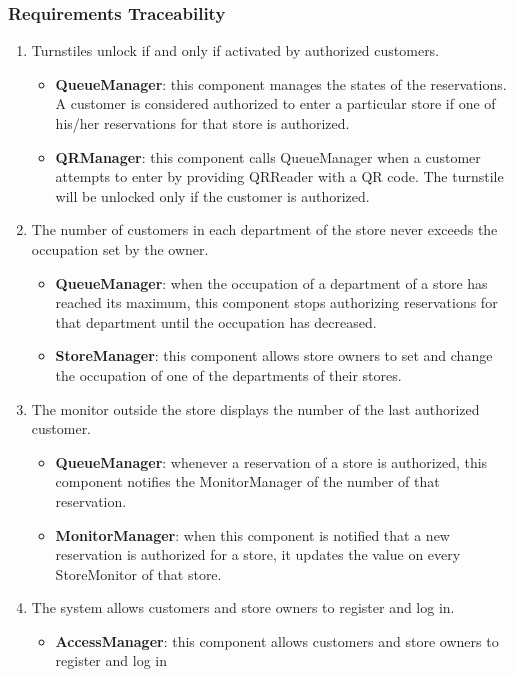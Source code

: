 \subsubsection{Requirements Traceability}
\begin{enumerate}[label=R\arabic*]
	\item Turnstiles unlock if and only if activated by authorized customers.
	\begin{itemize}
		\item \textbf{QueueManager}: this component manages the states of the reservations. A customer is considered authorized to enter a particular store if one of his/her reservations for that store is authorized.
		\item \textbf{QRManager}: this component calls QueueManager when a customer attempts to enter by providing QRReader with a QR code. The turnstile will be unlocked only if the customer is authorized.
	\end{itemize}
	\item The number of customers in each department of the store never exceeds the occupation set by the owner.
	\begin{itemize}
		\item \textbf{QueueManager}: when the occupation of a department of a store has reached its maximum, this component stops authorizing reservations for that department until the occupation has decreased.
		\item \textbf{StoreManager}: this component allows store owners to set and change the occupation of one of the departments of their stores.
	\end{itemize}
	\item The monitor outside the store displays the number of the last authorized customer.
	\begin{itemize}
		\item \textbf{QueueManager}: whenever a reservation of a store is authorized, this component notifies the MonitorManager of the number of that reservation.
		\item \textbf{MonitorManager}: when this component is notified that a new reservation is authorized for a store, it updates the value on every StoreMonitor of that store.
	\end{itemize}
	\item The system allows customers and store owners to register and log in.
	\begin{itemize}
		\item \textbf{AccessManager}: this component allows customers and store owners to register and log in

\end{itemize}
\end{enumerate}
